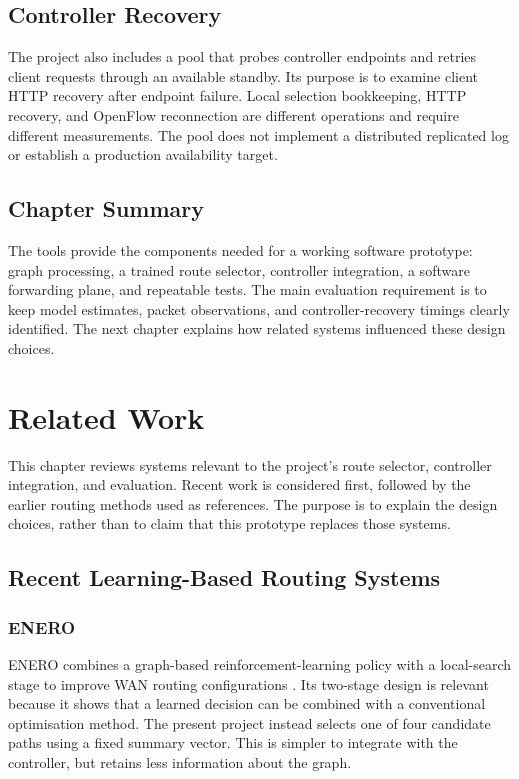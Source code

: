 \documentclass[12pt,a4paper,oneside]{report}
\let\cite\citep
\begin{document}
\section{Controller Recovery}
The project also includes a pool that probes controller endpoints and retries client requests through an available standby. Its purpose is to examine client HTTP recovery after endpoint failure. Local selection bookkeeping, HTTP recovery, and OpenFlow reconnection are different operations and require different measurements. The pool does not implement a distributed replicated log or establish a production availability target.

\section{Chapter Summary}
The tools provide the components needed for a working software prototype: graph processing, a trained route selector, controller integration, a software forwarding plane, and repeatable tests. The main evaluation requirement is to keep model estimates, packet observations, and controller-recovery timings clearly identified. The next chapter explains how related systems influenced these design choices.


\chapter{Related Work}
\label{chap:related}

This chapter reviews systems relevant to the project's route selector, controller integration, and evaluation. Recent work is considered first, followed by the earlier routing methods used as references. The purpose is to explain the design choices, rather than to claim that this prototype replaces those systems.

\section{Recent Learning-Based Routing Systems}
\subsection{ENERO}
ENERO combines a graph-based reinforcement-learning policy with a local-search stage to improve WAN routing configurations \cite{almasan2022enero}. Its two-stage design is relevant because it shows that a learned decision can be combined with a conventional optimisation method. The present project instead selects one of four candidate paths using a fixed summary vector. This is simpler to integrate with the controller, but retains less information about the graph.
\end{document}
